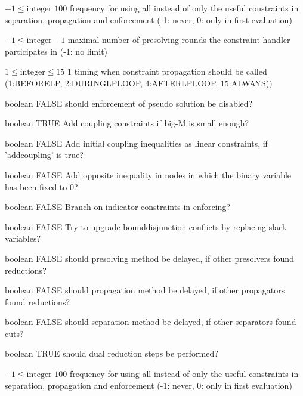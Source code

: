 %
{$-1\leq\textrm{integer}$}%
{$100$}%
{frequency for using all instead of only the useful constraints in separation, propagation and enforcement (-1: never, 0: only in first evaluation)}%
{}

%
{$-1\leq\textrm{integer}$}%
{$-1$}%
{maximal number of presolving rounds the constraint handler participates in (-1: no limit)}%
{}

%
{$1\leq\textrm{integer}\leq15$}%
{$1$}%
{timing when constraint propagation should be called (1:BEFORELP, 2:DURINGLPLOOP, 4:AFTERLPLOOP, 15:ALWAYS))}%
{}

%
{boolean}%
{FALSE}%
{should enforcement of pseudo solution be disabled?}%
{}

%
{boolean}%
{TRUE}%
{Add coupling constraints if big-M is small enough?}%
{}

%
{boolean}%
{FALSE}%
{Add initial coupling inequalities as linear constraints, if 'addcoupling' is true?}%
{}

%
{boolean}%
{FALSE}%
{Add opposite inequality in nodes in which the binary variable has been fixed to 0?}%
{}

%
{boolean}%
{FALSE}%
{Branch on indicator constraints in enforcing?}%
{}

%
{boolean}%
{FALSE}%
{Try to upgrade bounddisjunction conflicts by replacing slack variables?}%
{}

%
{boolean}%
{FALSE}%
{should presolving method be delayed, if other presolvers found reductions?}%
{}

%
{boolean}%
{FALSE}%
{should propagation method be delayed, if other propagators found reductions?}%
{}

%
{boolean}%
{FALSE}%
{should separation method be delayed, if other separators found cuts?}%
{}

%
{boolean}%
{TRUE}%
{should dual reduction steps be performed?}%
{}

%
{$-1\leq\textrm{integer}$}%
{$100$}%
{frequency for using all instead of only the useful constraints in separation, propagation and enforcement (-1: never, 0: only in first evaluation)}%
{}

